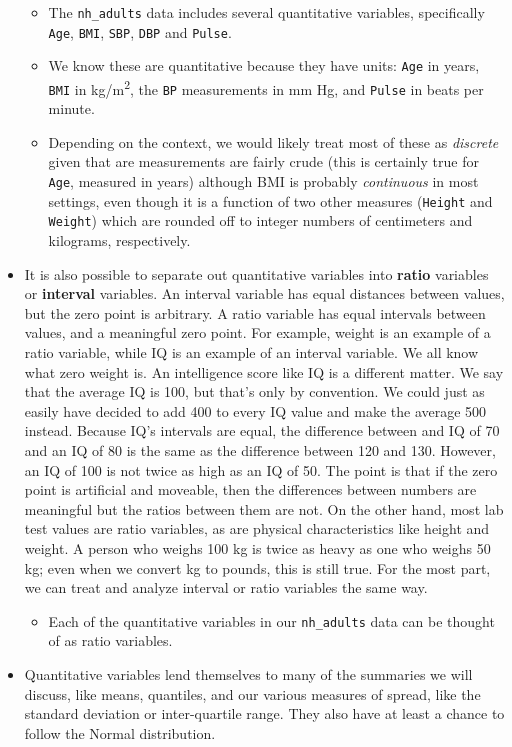 \documentclass[
]{book}
\providecommand{\tightlist}{%
  \setlength{\itemsep}{0pt}\setlength{\parskip}{0pt}}
\begin{document}
\begin{itemize}
  \begin{itemize}
  \tightlist
  \item
    The \texttt{nh\_adults} data includes several quantitative variables, specifically \texttt{Age}, \texttt{BMI}, \texttt{SBP}, \texttt{DBP} and \texttt{Pulse}.
  \item
    We know these are quantitative because they have units: \texttt{Age} in years, \texttt{BMI} in kg/m\textsuperscript{2}, the \texttt{BP} measurements in mm Hg, and \texttt{Pulse} in beats per minute.
  \item
    Depending on the context, we would likely treat most of these as \emph{discrete} given that are measurements are fairly crude (this is certainly true for \texttt{Age}, measured in years) although BMI is probably \emph{continuous} in most settings, even though it is a function of two other measures (\texttt{Height} and \texttt{Weight}) which are rounded off to integer numbers of centimeters and kilograms, respectively.
  \end{itemize}
\item
  It is also possible to separate out quantitative variables into \textbf{ratio} variables or \textbf{interval} variables. An interval variable has equal distances between values, but the zero point is arbitrary. A ratio variable has equal intervals between values, and a meaningful zero point. For example, weight is an example of a ratio variable, while IQ is an example of an interval variable. We all know what zero weight is. An intelligence score like IQ is a different matter. We say that the average IQ is 100, but that's only by convention. We could just as easily have decided to add 400 to every IQ value and make the average 500 instead. Because IQ's intervals are equal, the difference between and IQ of 70 and an IQ of 80 is the same as the difference between 120 and 130. However, an IQ of 100 is not twice as high as an IQ of 50. The point is that if the zero point is artificial and moveable, then the differences between numbers are meaningful but the ratios between them are not. On the other hand, most lab test values are ratio variables, as are physical characteristics like height and weight. A person who weighs 100 kg is twice as heavy as one who weighs 50 kg; even when we convert kg to pounds, this is still true. For the most part, we can treat and analyze interval or ratio variables the same way.

  \begin{itemize}
  \tightlist
  \item
    Each of the quantitative variables in our \texttt{nh\_adults} data can be thought of as ratio variables.
  \end{itemize}
\item
  Quantitative variables lend themselves to many of the summaries we will discuss, like means, quantiles, and our various measures of spread, like the standard deviation or inter-quartile range. They also have at least a chance to follow the Normal distribution.
\end{itemize}
\end{document}
